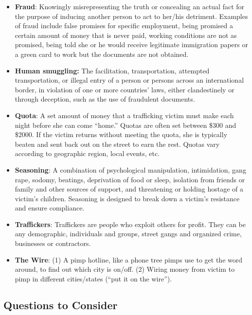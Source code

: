 \documentclass[10pt, letterpaper]{article}
\begin{document}
\begin{itemize}
\begin{itemize}
\end{itemize}
\item
\textbf{Fraud}: Knowingly misrepresenting the truth or concealing an
actual fact for the purpose of inducing another person to act to her/his
detriment. Examples of fraud include false promises for specific
employment, being promised a certain amount of money that is never paid,
working conditions are not as promised, being told she or he would
receive legitimate immigration papers or a green card to work but the
documents are not obtained.
\item
\textbf{Human smuggling:} The facilitation, transportation, attempted
transportation, or illegal entry of a person or persons across an
international border, in violation of one or more countries' laws,
either clandestinely or through deception, such as the use of fraudulent
documents.
\item
\textbf{Quota}: A set amount of money that a trafficking victim must
make each night before she can come ``home.'' Quotas are often set
between \$300 and \$2000. If the victim returns without meeting the
quota, she is typically beaten and sent back out on the street to earn
the rest. Quotas vary according to geographic region, local events, etc.
\item
\textbf{Seasoning}: A combination of psychological manipulation,
intimidation, gang rape, sodomy, beatings, deprivation of food or sleep,
isolation from friends or family and other sources of support, and
threatening or holding hostage of a victim's children. Seasoning is
designed to break down a victim's resistance and ensure compliance.
\item
\textbf{Traffickers}: Traffickers are people who exploit others for
profit. They can be any demographic, individuals and groups, street
gangs and organized crime, businesses or contractors.
\item
\textbf{The Wire}: (1) A pimp hotline, like a phone tree pimps use to
get the word around, to find out which city is on/off. (2) Wiring money
from victim to pimp in different cities/states (``put it on the wire'').
\end{itemize}

\subsection{Questions to Consider}
\end{document}
